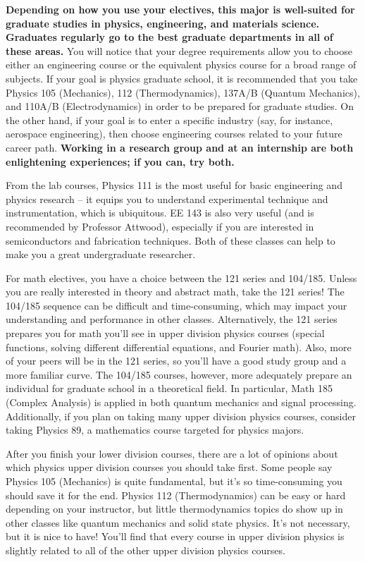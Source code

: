 \textbf{Depending on how you use your electives, this major is well-suited for graduate studies in physics, engineering, and materials science. Graduates regularly go to the best graduate departments in all of these areas.} You will notice that your degree requirements allow you to choose either an engineering course or the equivalent physics course for a broad range of subjects. If your goal is physics graduate school, it is recommended that you take Physics 105 (Mechanics), 112 (Thermodynamics), 137A/B (Quantum Mechanics), and 110A/B (Electrodynamics) in order to be prepared for graduate studies. On the other hand, if your goal is to enter a specific industry (say, for instance, aerospace engineering), then choose engineering courses related to your future career path. \textbf{Working in a research group and at an internship are both enlightening experiences; if you can, try both.}

From the lab courses, Physics 111 is the most useful for basic engineering and physics research – it equips you to understand experimental technique and instrumentation, which is ubiquitous. EE 143 is also very useful (and is recommended by Professor Attwood), especially if you are interested in semiconductors and fabrication techniques. Both of these classes can help to make you a great undergraduate researcher.

For math electives, you have a choice between the 121 series and 104/185. Unless you are really interested in theory and abstract math, take the 121 series! The 104/185 sequence can be difficult and time-consuming, which may impact your understanding and performance in other classes. Alternatively, the 121 series prepares you for math you’ll see in upper division physics courses (special functions, solving different differential equations, and Fourier math). Also, more of your peers will be in the 121 series, so you’ll have a good study group and a more familiar curve. The 104/185 courses, however, more adequately 
prepare an individual for graduate school in a theoretical field. In particular, Math 185 (Complex Analysis) is applied in both quantum mechanics and signal processing. Additionally, if you plan on taking many upper division physics courses, consider taking Physics 89, a mathematics course targeted for physics majors.

After you finish your lower division courses, there are a lot of opinions about which physics upper division courses you should take first. Some people say Physics 105 (Mechanics) is quite fundamental, but it’s so time-consuming you should save it for the end. Physics 112 (Thermodynamics) can be easy or hard depending on your instructor, but little thermodynamics topics do show up in other classes like quantum mechanics and solid state physics. It’s not necessary, but it is nice to have! You’ll find that every course in upper division physics is slightly related to all of the other upper division physics courses.

